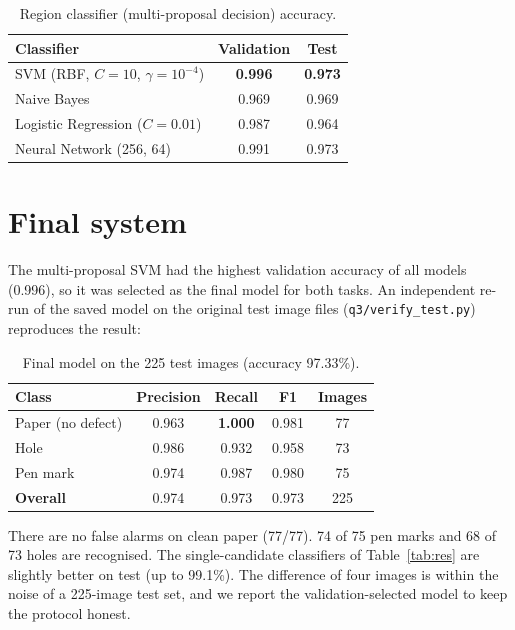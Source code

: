 \documentclass[11pt,a4paper]{report}
\newcommand{\best}[1]{\textbf{#1}}
\begin{document}
\begin{table}[H]
\centering
\caption{Region classifier (multi-proposal decision) accuracy.}
\label{tab:region}
\begin{tabular}{lcc}
\toprule
Classifier & Validation & Test\\
\midrule
SVM (RBF, $C=10$, $\gamma=10^{-4}$) & \best{0.996} & \best{0.973}\\
Naive Bayes & 0.969 & 0.969\\
Logistic Regression ($C=0.01$) & 0.987 & 0.964\\
Neural Network (256, 64) & 0.991 & 0.973\\
\bottomrule
\end{tabular}
\end{table}

\section{Final system}
The multi-proposal SVM had the highest validation accuracy of all models (0.996), so it was
selected as the final model for both tasks. An independent re-run of the saved model on the
original test image files (\texttt{q3/verify\_test.py}) reproduces the result:
\begin{table}[H]
\centering
\caption{Final model on the 225 test images (accuracy 97.33\%).}
\label{tab:final}
\begin{tabular}{lcccc}
\toprule
Class & Precision & Recall & F1 & Images\\
\midrule
Paper (no defect) & 0.963 & \best{1.000} & 0.981 & 77\\
Hole & 0.986 & 0.932 & 0.958 & 73\\
Pen mark & 0.974 & 0.987 & 0.980 & 75\\
\midrule
\textbf{Overall} & 0.974 & 0.973 & 0.973 & 225\\
\bottomrule
\end{tabular}
\end{table}
\noindent There are no false alarms on clean paper (77/77). 74 of 75 pen marks and 68 of 73
holes are recognised. The single-candidate classifiers of Table~\ref{tab:res} are slightly
better on test (up to 99.1\%). The difference of four images is within the noise of a
225-image test set, and we report the validation-selected model to keep the protocol honest.
\end{document}
